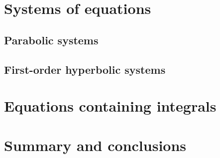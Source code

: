 \section{Systems of equations}

\subsection{Parabolic systems}
\subsection{First-order hyperbolic systems}

\section{Equations containing integrals}

\section{Summary and conclusions}